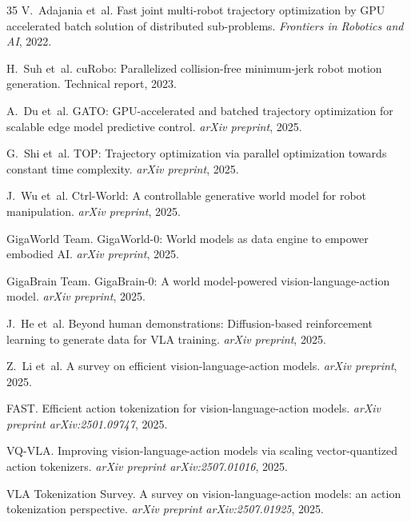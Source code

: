 \documentclass[11pt]{article}
\begin{document}
\begin{thebibliography}{35}
  V.~Adajania et~al.
  \newblock Fast joint multi-robot trajectory optimization by GPU accelerated batch solution of distributed sub-problems.
  \newblock \emph{Frontiers in Robotics and AI}, 2022.

  H.~Suh et~al.
  \newblock cuRobo: Parallelized collision-free minimum-jerk robot motion generation.
  \newblock Technical report, 2023.

  A.~Du et~al.
  \newblock GATO: GPU-accelerated and batched trajectory optimization for scalable edge model predictive control.
  \newblock \emph{arXiv preprint}, 2025.

  G.~Shi et~al.
  \newblock TOP: Trajectory optimization via parallel optimization towards constant time complexity.
  \newblock \emph{arXiv preprint}, 2025.

  J.~Wu et~al.
  \newblock Ctrl-World: A controllable generative world model for robot manipulation.
  \newblock \emph{arXiv preprint}, 2025.

  GigaWorld Team.
  \newblock GigaWorld-0: World models as data engine to empower embodied AI.
  \newblock \emph{arXiv preprint}, 2025.

  GigaBrain Team.
  \newblock GigaBrain-0: A world model-powered vision-language-action model.
  \newblock \emph{arXiv preprint}, 2025.

  J.~He et~al.
  \newblock Beyond human demonstrations: Diffusion-based reinforcement learning to generate data for VLA training.
  \newblock \emph{arXiv preprint}, 2025.

  Z.~Li et~al.
  \newblock A survey on efficient vision-language-action models.
  \newblock \emph{arXiv preprint}, 2025.

  FAST.
  \newblock Efficient action tokenization for vision-language-action models.
  \newblock \emph{arXiv preprint arXiv:2501.09747}, 2025.

  VQ-VLA.
  \newblock Improving vision-language-action models via scaling vector-quantized action tokenizers.
  \newblock \emph{arXiv preprint arXiv:2507.01016}, 2025.

  VLA Tokenization Survey.
  \newblock A survey on vision-language-action models: an action tokenization perspective.
  \newblock \emph{arXiv preprint arXiv:2507.01925}, 2025.


\end{thebibliography}
\end{document}
